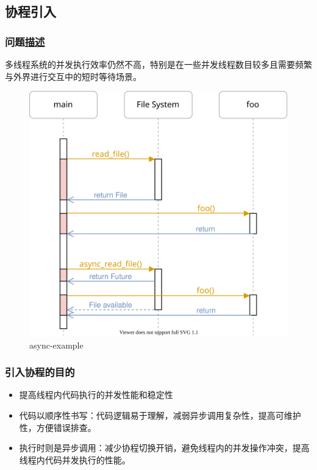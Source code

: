 \subsection{协程引入}
% 
\begin{frame}[fragile]
    \frametitle{问题\href{https://os.phil-opp.com/async-await/\#example}{描述}}
% 
多线程系统的并发执行效率仍然不高，特别是在一些并发线程数目较多且需要频繁与外界进行交互中的短时等待场景。
% 

  \begin{figure}
    \centering
    \includegraphics[width=0.5\linewidth]{figs/async-example.svg}
    \caption{async-example}
  \end{figure}



% 

\end{frame}
\begin{frame}[fragile]
    \frametitle{引入协程的目的}

    \begin{itemize}
        \item 提高线程内代码执行的并发性能和稳定性
        \item 代码以顺序性书写：代码逻辑易于理解，减弱异步调用复杂性，提高可维护性，方便错误排查。
        \item 执行时则是异步调用：减少协程切换开销，避免线程内的并发操作冲突，提高线程内代码并发执行的性能。
    \end{itemize}
\end{frame}
% 
